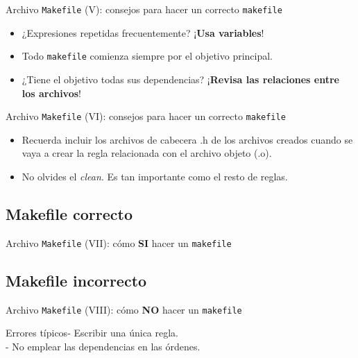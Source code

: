 \documentclass{beamer}
\begin{document}
	\begin{frame}{Archivo \texttt{Makefile} (V): consejos para hacer un correcto \texttt{makefile}}
		\begin{itemize}
			\item ¿Expresiones repetidas frecuentemente? ¡\textbf{Usa variables}!
			\vfill\item Todo \texttt{makefile} comienza siempre por el objetivo principal. 
			\vfill\item ¿Tiene el objetivo todas sus dependencias? ¡\textbf{Revisa las relaciones entre los archivos}! 		
		\end{itemize}
	\end{frame}

	\begin{frame}{Archivo \texttt{Makefile} (VI): consejos para hacer un correcto \texttt{makefile}}
		\begin{itemize}
			
			\vfill\item Recuerda incluir los archivos de cabecera .h de los archivos creados cuando se vaya a crear la regla relacionada con el archivo objeto (.o). 			
			
			\vfill\item No olvides el \textit{clean}. Es tan importante como el resto de reglas.
		\end{itemize}
	\end{frame}


\subsection{Makefile correcto}
	\begin{frame}{Archivo \texttt{Makefile} (VII): cómo \textbf{SI} hacer un \texttt{makefile}}
		
	\end{frame}	
	
\subsection{Makefile incorrecto}
	\begin{frame}{Archivo \texttt{Makefile} (VIII): cómo \textbf{NO} hacer un \texttt{makefile}}
\begin{bclogo}[arrondi=0.1,
    couleur=white, logo=\bcattention,
    ombre=true, couleurOmbre=gray!50, epOmbre=0.1, blur,
    barre=none, 
    ]{Errores típicos}{- Escribir una única regla. \\ - No emplear las dependencias en las órdenes.}
\end{bclogo}
		

	\end{frame}	
\end{document}
